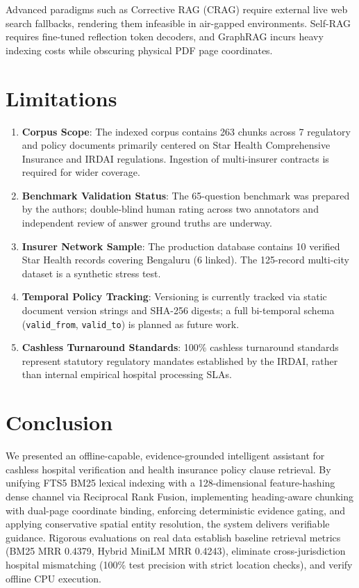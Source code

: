 \documentclass[conference]{IEEEtran}
\begin{document}
Advanced paradigms such as Corrective RAG (CRAG) \cite{yan2024crag} require external live web search fallbacks, rendering them infeasible in air-gapped environments. Self-RAG \cite{asai2024selfrag} requires fine-tuned reflection token decoders, and GraphRAG \cite{edge2024graphrag} incurs heavy indexing costs while obscuring physical PDF page coordinates.

\section{Limitations}
\begin{enumerate}
    \item \textbf{Corpus Scope}: The indexed corpus contains 263 chunks across 7 regulatory and policy documents primarily centered on Star Health Comprehensive Insurance and IRDAI regulations. Ingestion of multi-insurer contracts is required for wider coverage.
    \item \textbf{Benchmark Validation Status}: The 65-question benchmark was prepared by the authors; double-blind human rating across two annotators and independent review of answer ground truths are underway.
    \item \textbf{Insurer Network Sample}: The production database contains 10 verified Star Health records covering Bengaluru (6 linked). The 125-record multi-city dataset is a synthetic stress test.
    \item \textbf{Temporal Policy Tracking}: Versioning is currently tracked via static document version strings and SHA-256 digests; a full bi-temporal schema (\texttt{valid\_from}, \texttt{valid\_to}) is planned as future work.
    \item \textbf{Cashless Turnaround Standards}: 100\% cashless turnaround standards represent statutory regulatory mandates established by the IRDAI, rather than internal empirical hospital processing SLAs.
\end{enumerate}

\section{Conclusion}
We presented an offline-capable, evidence-grounded intelligent assistant for cashless hospital verification and health insurance policy clause retrieval. By unifying FTS5 BM25 lexical indexing with a 128-dimensional feature-hashing dense channel via Reciprocal Rank Fusion, implementing heading-aware chunking with dual-page coordinate binding, enforcing deterministic evidence gating, and applying conservative spatial entity resolution, the system delivers verifiable guidance. Rigorous evaluations on real data establish baseline retrieval metrics (BM25 MRR 0.4379, Hybrid MiniLM MRR 0.4243), eliminate cross-jurisdiction hospital mismatching (100\% test precision with strict location checks), and verify offline CPU execution.
\end{document}
